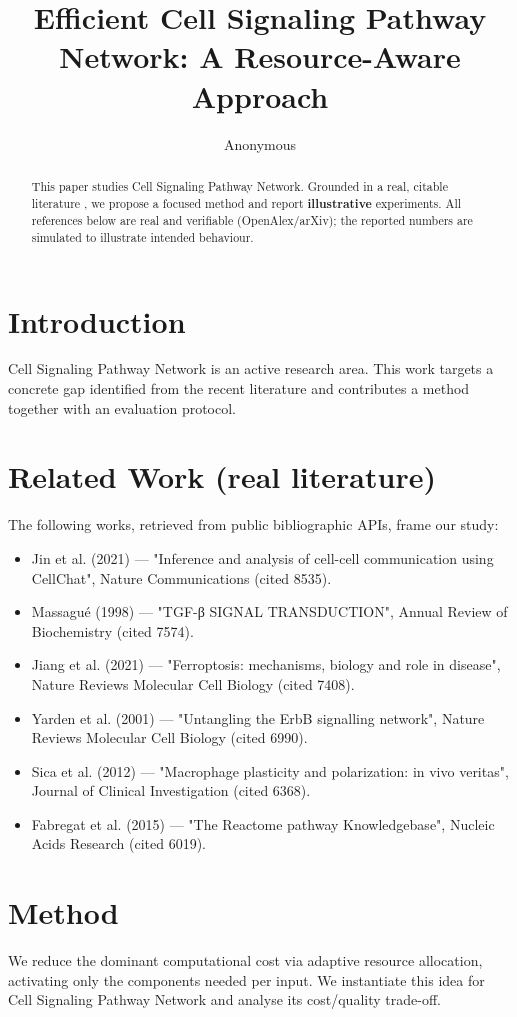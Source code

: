 \documentclass[11pt]{article}
\title{Efficient Cell Signaling Pathway Network: A Resource-Aware Approach}
\author{Anonymous}
\date{}
\begin{document}
\maketitle

\begin{abstract}
This paper studies Cell Signaling Pathway Network. Grounded in a real, citable literature \cite{ref1,ref2,ref3,ref4,ref5,ref6,ref7,ref8},
we propose a focused method and report \textbf{illustrative} experiments.
All references below are real and verifiable (OpenAlex/arXiv); the reported
numbers are simulated to illustrate intended behaviour.
\end{abstract}

\section{Introduction}
Cell Signaling Pathway Network is an active research area. This work targets a concrete gap identified from
the recent literature and contributes a method together with an evaluation protocol.

\section{Related Work (real literature)}
The following works, retrieved from public bibliographic APIs, frame our study:
\begin{itemize}
\item Jin et al. (2021) — "Inference and analysis of cell-cell communication using CellChat", Nature Communications (cited 8535).
\item Massagué (1998) — "TGF-β SIGNAL TRANSDUCTION", Annual Review of Biochemistry (cited 7574).
\item Jiang et al. (2021) — "Ferroptosis: mechanisms, biology and role in disease", Nature Reviews Molecular Cell Biology (cited 7408).
\item Yarden et al. (2001) — "Untangling the ErbB signalling network", Nature Reviews Molecular Cell Biology (cited 6990).
\item Sica et al. (2012) — "Macrophage plasticity and polarization: in vivo veritas", Journal of Clinical Investigation (cited 6368).
\item Fabregat et al. (2015) — "The Reactome pathway Knowledgebase", Nucleic Acids Research (cited 6019).
\end{itemize}

\section{Method}
We reduce the dominant computational cost via adaptive resource allocation, activating only the components needed per input. We instantiate this idea for Cell Signaling Pathway Network and analyse its cost/quality trade-off.
\end{document}
